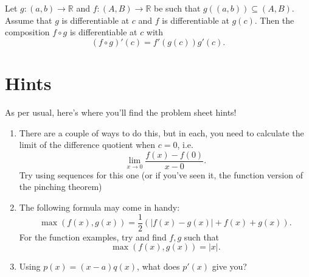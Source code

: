 \documentclass[
  10pt,
  a4paper]{article}
\providecommand{\tightlist}{%
  \setlength{\itemsep}{0pt}\setlength{\parskip}{0pt}}
\theoremstyle{plain}
\theoremstyle{definition}
\theoremstyle{plain}
\theoremstyle{plain}
\theoremstyle{plain}
\theoremstyle{plain}
\theoremstyle{definition}
\theoremstyle{definition}
\theoremstyle{remark}
\theoremstyle{remark}
\let\BeginKnitrBlock\begin \let\EndKnitrBlock\end
\begin{document}
\BeginKnitrBlock{theorem}[Chain Rule]
{\label{thm:thm2} }Let \(g:(a,b) \to \mathbb{R}\) and \(f:(A,B) \to \mathbb{R}\) be such that \(g\left((a,b)\right) \subseteq (A,B).\) Assume that \(g\) is differentiable at \(c\) and \(f\) is differentiable at \(g(c)\). Then the composition \(f\circ g\) is differentiable at \(c\) with \[\left(f\circ g\right)'(c) = f'\left(g(c)\right)g'(c).\]
\EndKnitrBlock{theorem}

\hypertarget{hints}{%
\section{Hints}\label{hints}}

As per usual, here's where you'll find the problem sheet hints!

\begin{enumerate}
\def\labelenumi{\arabic{enumi})}
\tightlist
\item
  There are a couple of ways to do this, but in each, you need to calculate the limit of the difference quotient when \(c=0\), i.e.~\[\lim_{x\to 0}\frac{f(x) - f(0)}{x - 0}.\] Try using sequences for this one (or if you've seen it, the function version of the pinching theorem)
\item
  The following formula may come in handy:\[\max(f(x),g(x)) = \frac{1}{2}\left(\lvert f(x) - g(x) \rvert + f(x) + g(x)\right).\]
  For the function examples, try and find \(f,g\) such that \[\max(f(x),g(x)) = \lvert x \rvert.\]
\item
  Using \(p(x) = (x-a)q(x)\), what does \(p'(x)\) give you?
\end{enumerate}
\end{document}
